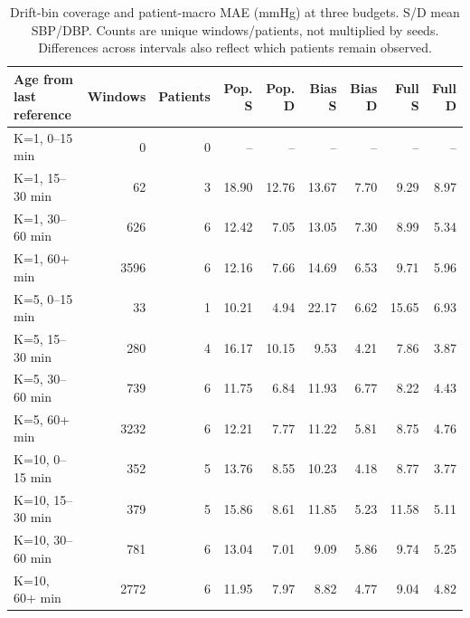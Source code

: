 \documentclass[11pt]{article}
\begin{document}
\begin{table}[!htbp]\centering\scriptsize
\begin{tabular}{lrrrrrrrr}\toprule
Age from last reference & Windows & Patients & Pop. S & Pop. D & Bias S & Bias D & Full S & Full D\\\midrule
K=1, 0--15 min & 0 & 0 & -- & -- & -- & -- & -- & --\\
K=1, 15--30 min & 62 & 3 & 18.90 & 12.76 & 13.67 & 7.70 & 9.29 & 8.97\\
K=1, 30--60 min & 626 & 6 & 12.42 & 7.05 & 13.05 & 7.30 & 8.99 & 5.34\\
K=1, 60+ min & 3596 & 6 & 12.16 & 7.66 & 14.69 & 6.53 & 9.71 & 5.96\\
K=5, 0--15 min & 33 & 1 & 10.21 & 4.94 & 22.17 & 6.62 & 15.65 & 6.93\\
K=5, 15--30 min & 280 & 4 & 16.17 & 10.15 & 9.53 & 4.21 & 7.86 & 3.87\\
K=5, 30--60 min & 739 & 6 & 11.75 & 6.84 & 11.93 & 6.77 & 8.22 & 4.43\\
K=5, 60+ min & 3232 & 6 & 12.21 & 7.77 & 11.22 & 5.81 & 8.75 & 4.76\\
K=10, 0--15 min & 352 & 5 & 13.76 & 8.55 & 10.23 & 4.18 & 8.77 & 3.77\\
K=10, 15--30 min & 379 & 5 & 15.86 & 8.61 & 11.85 & 5.23 & 11.58 & 5.11\\
K=10, 30--60 min & 781 & 6 & 13.04 & 7.01 & 9.09 & 5.86 & 9.74 & 5.25\\
K=10, 60+ min & 2772 & 6 & 11.95 & 7.97 & 8.82 & 4.77 & 9.04 & 4.82\\
\bottomrule\end{tabular}
\caption{Drift-bin coverage and patient-macro MAE (mmHg) at three budgets. S/D mean SBP/DBP. Counts are unique windows/patients, not multiplied by seeds. Differences across intervals also reflect which patients remain observed.}\end{table}
\end{document}
